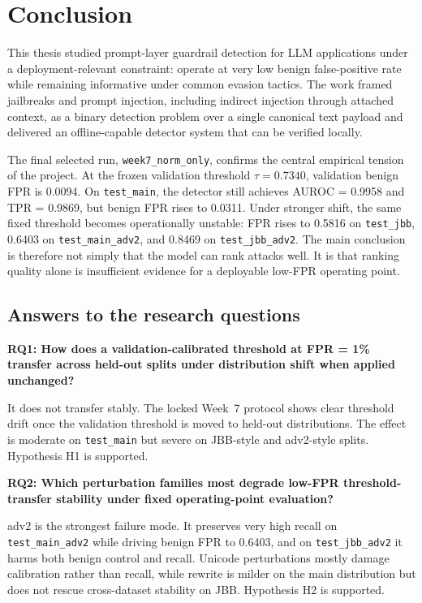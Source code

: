 \chapter{Conclusion}
\label{ch:conclusion}

This thesis studied prompt-layer guardrail detection for LLM applications under a deployment-relevant constraint: operate at very low benign false-positive rate while remaining informative under common evasion tactics. The work framed jailbreaks and prompt injection, including indirect injection through attached context, as a binary detection problem over a single canonical text payload and delivered an offline-capable detector system that can be verified locally.

The final selected run, \texttt{week7\_norm\_only}, confirms the central empirical tension of the project. At the frozen validation threshold $\tau = 0.7340$, validation benign FPR is 0.0094. On \texttt{test\_main}, the detector still achieves AUROC = 0.9958 and TPR = 0.9869, but benign FPR rises to 0.0311. Under stronger shift, the same fixed threshold becomes operationally unstable: FPR rises to 0.5816 on \texttt{test\_jbb}, 0.6403 on \texttt{test\_main\_adv2}, and 0.8469 on \texttt{test\_jbb\_adv2}. The main conclusion is therefore not simply that the model can rank attacks well. It is that ranking quality alone is insufficient evidence for a deployable low-FPR operating point.

\section{Answers to the research questions}

\textbf{RQ1: How does a validation-calibrated threshold at FPR = 1\% transfer across held-out splits under distribution shift when applied unchanged?}

It does not transfer stably. The locked Week~7 protocol shows clear threshold drift once the validation threshold is moved to held-out distributions. The effect is moderate on \texttt{test\_main} but severe on JBB-style and adv2-style splits. Hypothesis H1 is supported.

\textbf{RQ2: Which perturbation families most degrade low-FPR threshold-transfer stability under fixed operating-point evaluation?}

adv2 is the strongest failure mode. It preserves very high recall on \texttt{test\_main\_adv2} while driving benign FPR to 0.6403, and on \texttt{test\_jbb\_adv2} it harms both benign control and recall. Unicode perturbations mostly damage calibration rather than recall, while rewrite is milder on the main distribution but does not rescue cross-dataset stability on JBB. Hypothesis H2 is supported.


